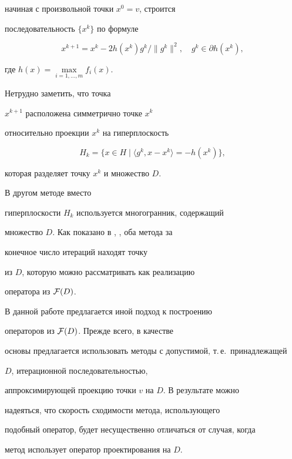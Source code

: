 начиная с произвольной точки $x^{0} =v$, строится


последовательность $\{ x^{k}\}$ по формуле


$$


 x^{k+1}=x^{k} - 2 h(x^{k}) g^{k}/\| g^{k}\|^{2},\quad


 g^{k}\in \partial h(x^{k}),


$$


где $h(x)=\max\limits_{i=1,\dotsc,m} f_{i}(x)$.


Нетрудно заметить, что точка


$x^{k+1}$ расположена симметрично точке $x^{k}$


относительно проекции $x^{k}$ на гиперплоскость


$$


 H_{k} =


 \{ x \in H \mid \langle g^{k}, x - x^{k} \rangle = -h(x^{k}) \},


$$


которая разделяет точку $x^{k}$ и множество $D$.


В другом методе \cite{KF87} вместо


гиперплоскости $H_{k}$ используется многогранник, содержащий


множество $D$. Как показано в \cite{KF84}, \cite{KF87}, оба метода за


конечное число итераций находят точку


из $D$, которую можно рассматривать как реализацию


оператора из ${\cal F}(D)$.





 В данной работе предлагается иной подход к построению


 операторов из $ {\cal F}(D)$. Прежде всего, в качестве


основы предлагается использовать методы с допустимой, т.\,е.~принадлежащей


$D$, итерационной последовательностью,


аппроксимирующей проекцию точки $v$ на $D$. В результате можно


надеяться, что скорость сходимости метода, использующего


подобный оператор, будет несущественно отличаться от случая, когда


метод использует оператор проектирования на $D$.





